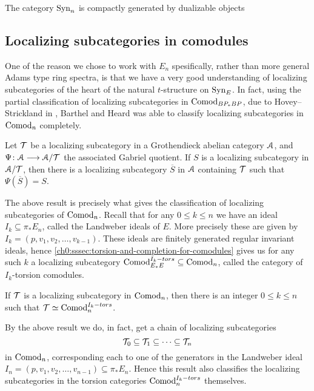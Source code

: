 \begin{lemma}
    The category $\mathrm{Syn}_n$ is compactly generated by dualizable objects 
\end{lemma}





\subsection{Localizing subcategories in comodules}

One of the reason we chose to work with $E_n$ spesifically, rather than more general Adams type ring spectra, is that we have a very good understanding of localizing subcategories of the heart of the natural $t$-structure on $\mathrm{Syn}_{E}$. In fact, using the partial classification of localizing subcategories in $\mathrm{Comod}_{BP_*BP}$, due to Hovey--Strickland in \cite{hovey-strickland_2005a}, Barthel and Heard was able to classify localizing subcategories in $\mathrm{Comod}_n$ completely. 

\begin{proposition}
    Let $\mathcal{T}$ be a localizing subcategory in a Grothendieck abelian category $\EuScript{A}$, and $\Psi\colon\EuScript{A}\longrightarrow \EuScript{A}/\mathcal{T}$ the associated Gabriel quotient. If $S$ is a localizing subcategory in $\EuScript{A}/\mathcal{T}$, then there is a localizing subcategory $\overline{S}$ in $\EuScript{A}$ containing $\mathcal{T}$ such that $\Psi(\overline{S})=S$. 
\end{proposition}

The above result is precisely what gives the classification of localizing subcategories of $\mathrm{Comod}_n$. Recall that for any $0\leq k\leq n$ we have an ideal $I_k \subseteq \pi_* E_n$, called the Landweber ideals of $E$. More precisely these are given by $I_k = (p, v_1, v_2, \ldots, v_{k-1})$. These ideals are finitely generated regular invariant ideals, hence \cref{ch0:sssec:torsion-and-completion-for-comodules} gives us for any such $k$ a localizing subcategory $\mathrm{Comod}_{E_*E}^{I_k-tors}\subseteq \mathrm{Comod}_n$, called the category of $I_k$-torsion comodules. 

\begin{theorem}
    \label{ch3:add:thm:classification-of-abelian-localizing}
    If $\mathcal{T}$ is a localizing subcategory in $\mathrm{Comod}_n$, then there is an integer $0\leq k\leq n$ such that $\mathcal{T} \simeq \mathrm{Comod}_n^{I_k-tors}$. 
\end{theorem}

\begin{remark}
    By the above result we do, in fact, get a chain of localizing subcategories
    \[\mathcal{T}_0 \subseteq \mathcal{T}_1\subseteq \cdots \subseteq \mathcal{T}_n \]
    in $\mathrm{Comod}_n$, corresponding each to one of the generators in the Landweber ideal $I_n=(p, v_1, v_2, \ldots, v_{n-1})\subseteq \pi_* E_n$. Hence this result also classifies the localizing subcategories in the torsion categories $\mathrm{Comod}_n^{I_k-tors}$ themselves.  
\end{remark}


